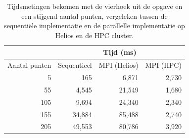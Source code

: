 \documentclass[titlepage,a4paper]{article}
\begin{document}
\begin{table}[here]
\caption{Tijdsmetingen bekomen met de vierhoek uit de opgave en een stijgend aantal punten, vergeleken tussen de sequenti\"ele implementatie en de parallelle implementatie op Helios en de HPC cluster.}
\label{tab:tijdsmetingen_mpi}
\centering
\begin{tabular}{|r|r|r|r|}
\cline{2-4}
\multicolumn{1}{c|}{} & \multicolumn{3}{c|}{Tijd (ms)} \\
\hline
Aantal punten & Sequentieel & MPI (Helios) & MPI (HPC) \\
\hline
5 & 165 & 6,871 & 2,730 \\
55 & 4,545 & 21,549 & 1,680 \\
105 & 9,694 & 24,340 & 2,340 \\
155 & 34,884 & 85,488 & 2,740 \\
205 & 49,553 & 80,786 & 3,920 \\
\hline
\end{tabular}
\end{table}
\end{document}
